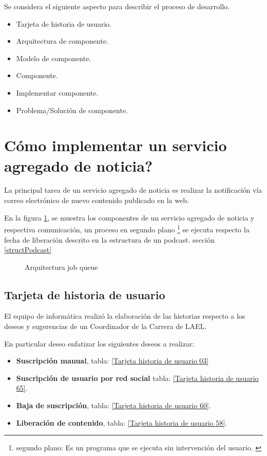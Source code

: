 Se considera el siguiente aspecto para describir el proceso de desarrollo.

\begin{itemize}

\item Tarjeta de historia de usuario.
\item Arquitectura de componente.
\item Modelo de componente.
\item Componente.
\item Implementar componente.
\item Problema/Solución de componente.

\end{itemize}

\section{\textquestiondown Cómo implementar un servicio agregado de noticia?} \label{serviceFeed}

La principal tarea de un servicio agregado de noticia es realizar la
notificación vía correo electrónico de nuevo contenido publicado en la web.

En la figura \ref{fig:Arquitectura job queue}, se muestra los componentes de
un servicio agregado de noticia y respectiva comunicación, un proceso en
segundo plano \footnote{segundo plano: Es un programa que se ejecuta sin
intervención del usuario. \cite{background}} se ejecuta respecto la fecha
de liberación descrito en la estructura de un podcast. sección
\ref{structPodcast}

\begin{figure}[!ht]
	\centering
	\caption{Arquitectura job queue}
	\label{fig:Arquitectura job queue}
\end{figure}


\subsection{Tarjeta de historia de usuario}

El equipo de informática realizó la elaboración de las historias respecto
a los deseos y sugerencias de un Coordinador de la Carrera de LAEL.

En particular deseo enfatizar los siguientes deseos a realizar:

\begin{itemize}

\item \textbf{Suscripción manual}, tabla: \ref{Tarjeta historia de usuario 03}
\item \textbf{Suscripción de usuario por red social} tabla: 
\ref{Tarjeta historia de usuario 65}.
\item \textbf{Baja de suscripción}, tabla: 
\ref{Tarjeta historia de usuario 60}.
\item \textbf{Liberación de contenido}, tabla: 
\ref{Tarjeta historia de usuario 58}.

\end{itemize}

